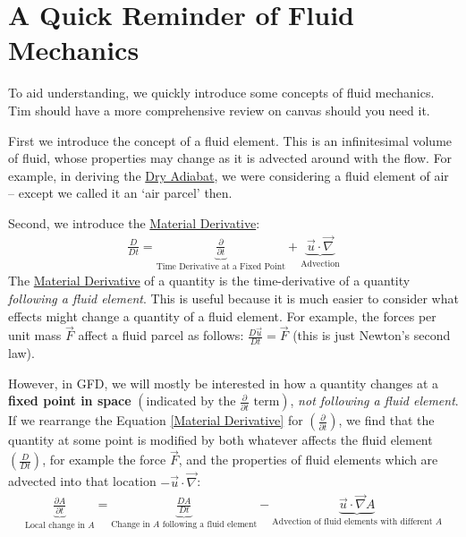 \section{A Quick Reminder of Fluid Mechanics}

To aid understanding, we quickly introduce some concepts of fluid mechanics. Tim should have a more comprehensive review on canvas should you need it.

First we introduce the concept of a fluid element. This is an infinitesimal volume of fluid, whose properties may change as it is advected around with the flow. For example, in deriving the \hyperref[Dry Adiabat]{Dry Adiabat}, we were considering a fluid element of air – except we called it an `air parcel' then.

Second, we introduce the \hyperref[Material Derivative]{Material Derivative}:
\begin{align}
    \frac{D}{Dt}=\underbrace{\frac{\partial}{\partial t}}_{\text{Time Derivative at a Fixed Point}}+\underbrace{\vec{u}\cdot\vec{\nabla}}_{\text{Advection}}
    \label{Material Derivative}
\end{align}
The \hyperref[Material Derivative]{Material Derivative} of a quantity is the time-derivative of a quantity \textit{following a fluid element}. This is useful because it is much easier to consider what effects might change a quantity of a fluid element. For example, the forces per unit mass $\vec{F}$ affect a fluid parcel as follows: $\frac{D\vec{u}}{Dt}=\vec{F}$ (this is just Newton's second law).

However, in GFD, we will mostly be interested in how a quantity changes at a \textbf{fixed point in space} $\left(\text{indicated by the } \frac{\partial}{\partial t} \text{ term}\right)$, \textit{not following a fluid element}. If we rearrange the Equation \ref{Material Derivative} for $\left( \frac{\partial}{\partial t} \right)$, we find that the quantity at some point is modified by both whatever affects the fluid element $\left( \frac{D}{D t} \right)$, for example the force $\vec{F}$, and the properties of fluid elements which are advected into that location $-\vec{u}\cdot\vec{\nabla}$:
\begin{align}\label{MatDerivTerms}
    \underbrace{\frac{\partial A}{\partial t}}_{\text{Local change in }A}=
    \underbrace{\frac{DA}{Dt}}_{{\text{Change in }A \text{ following a fluid element}}}-
    \underbrace{\vec{u}\cdot\vec{\nabla}A}_{\text{Advection of fluid elements with different }A}
\end{align}

